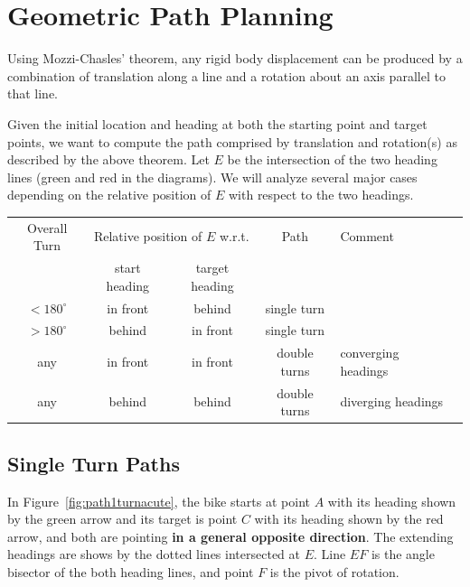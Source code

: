 \documentclass{article}
\newcommand{\Wheel}[3]{
  \begin{scope}[shift={#1},rotate=#2]
    \draw[rounded corners=9,#3] (-1,-5) rectangle (1,5);
  \end{scope}
}
\begin{document}
\bigskip
{}


\section*{Geometric Path Planning}

Using Mozzi-Chasles' theorem, any rigid body displacement can be produced by a combination of
translation along a line and a rotation about an axis parallel to that line.

Given the initial location and heading at both the starting point and target points,
we want to compute the path comprised by translation and rotation(s) as described by 
the above theorem.
Let $E$ be the intersection of the two heading lines (green and red in the diagrams).
We will analyze several major cases depending on the relative position of $E$
with respect to the two headings.


\begin{table}
  \begin{tabular}{ccccll}
    \toprule
    Overall Turn & \multicolumn{2}{c}{Relative position of $E$ w.r.t.} & Path & Comment\\
    & start heading & target heading &\\
    \midrule
    $< 180^\circ$ & in front & behind & single turn\\
    $> 180^\circ$ & behind & in front & single turn\\
    any & in front & in front & double turns & converging headings\\
    any & behind & behind & double turns & diverging headings\\
    \bottomrule
  \end{tabular}
\end{table}

\subsection*{Single Turn Paths}
In Figure~\ref{fig:path1turnacute}, the bike starts at point $A$ with its heading shown by
the green arrow and its target is point $C$ with its heading shown by the red arrow,
and both are pointing \textbf{in a general opposite direction}.
The extending headings are shows by the dotted lines intersected at $E$.
Line $EF$ is the angle bisector of the both heading lines, and point $F$ is the
pivot of rotation.
\end{document}
